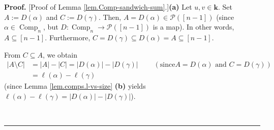 \documentclass[numbers=enddot,12pt,final,onecolumn,notitlepage]{scrartcl}%
\theoremstyle{definition}
\newenvironment{proof}[1][Proof]{\noindent\textbf{#1.} }{\ \rule{0.5em}{0.5em}}
\newenvironment{vershort}{}{}
\begin{document}
\begin{vershort}


\begin{proof}
[Proof of Lemma \ref{lem.Comp-sandwich-sum}.]\textbf{(a)} Let $u,v\in
\mathbf{k}$. Set $A:=D\left(  \alpha\right)  $ and $C:=D\left(  \gamma\right)
$. Then, $A=D\left(  \alpha\right)  \in\mathcal{P}\left(  \left[  n-1\right]
\right)  $ (since $\alpha\in\operatorname*{Comp}\nolimits_{n}$, but
$D:\operatorname*{Comp}\nolimits_{n}\rightarrow\mathcal{P}\left(  \left[
n-1\right]  \right)  $ is a map). In other words, $A\subseteq\left[
n-1\right]  $. Furthermore, $C=D\left(  \gamma\right)  \subseteq D\left(
\alpha\right)  =A\subseteq\left[  n-1\right]  $.

From $C\subseteq A$, we obtain%
\begin{align*}
\left\vert A\setminus C\right\vert  &  =\left\vert A\right\vert -\left\vert
C\right\vert =\left\vert D\left(  \alpha\right)  \right\vert -\left\vert
D\left(  \gamma\right)  \right\vert \ \ \ \ \ \ \ \ \ \ \left(  \text{since
}A=D\left(  \alpha\right)  \text{ and }C=D\left(  \gamma\right)  \right) \\
&  =\ell\left(  \alpha\right)  -\ell\left(  \gamma\right)
\end{align*}
(since Lemma \ref{lem.comps.l-vs-size} \textbf{(b) }yields $\ell\left(
\alpha\right)  -\ell\left(  \gamma\right)  =\left\vert D\left(  \alpha\right)
\right\vert -\left\vert D\left(  \gamma\right)  \right\vert $).


\end{proof}
\end{vershort}
\end{document}
